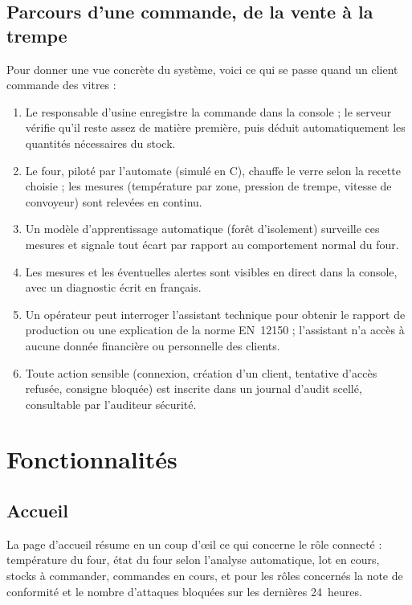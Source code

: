 \documentclass[11pt,a4paper]{report}
\begin{document}
\section{Parcours d'une commande, de la vente à la trempe}
Pour donner une vue concrète du système, voici ce qui se passe quand un client
commande des vitres :
\begin{enumerate}
  \item Le responsable d'usine enregistre la commande dans la console ; le
    serveur vérifie qu'il reste assez de matière première, puis déduit
    automatiquement les quantités nécessaires du stock.
  \item Le four, piloté par l'automate (simulé en C), chauffe le verre selon la
    recette choisie ; les mesures (température par zone, pression de trempe,
    vitesse de convoyeur) sont relevées en continu.
  \item Un modèle d'apprentissage automatique (forêt d'isolement) surveille ces
    mesures et signale tout écart par rapport au comportement normal du four.
  \item Les mesures et les éventuelles alertes sont visibles en direct dans la
    console, avec un diagnostic écrit en français.
  \item Un opérateur peut interroger l'assistant technique pour obtenir le
    rapport de production ou une explication de la norme EN~12150 ; l'assistant
    n'a accès à aucune donnée financière ou personnelle des clients.
  \item Toute action sensible (connexion, création d'un client, tentative
    d'accès refusée, consigne bloquée) est inscrite dans un journal d'audit
    scellé, consultable par l'auditeur sécurité.
\end{enumerate}

\chapter{Fonctionnalités}

\section{Accueil}
La page d'accueil résume en un coup d'œil ce qui concerne le rôle connecté :
température du four, état du four selon l'analyse automatique, lot en cours,
stocks à commander, commandes en cours, et pour les rôles concernés la note de
conformité et le nombre d'attaques bloquées sur les dernières 24~heures.

\end{document}
